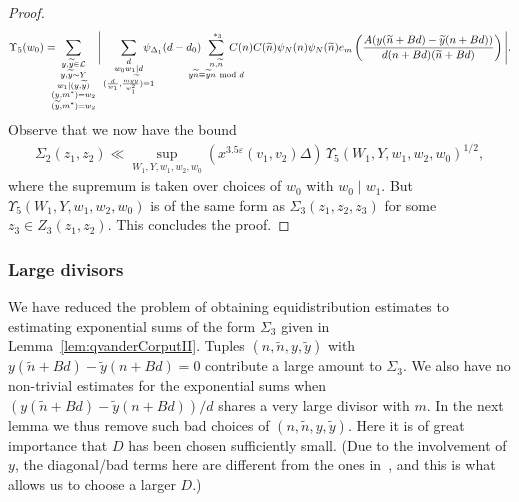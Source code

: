 \documentclass{amsart}
\numberwithin{equation}{section}
\begin{document}
\begin{proof}
\begin{align*}
\Upsilon_5(w_0)=\!\!\!\!\sum_{\substack{y, \widetilde{y} \in \mathcal{L} \\ y, \widetilde{y} \sim Y \\ w_1 \mid (y, \widetilde{y}) \\ (y,m^*)=w_2 \\ (\widetilde{y},m^*)=w_2}}\Bigg|\sum_{\substack{d \\ w_0w_1 \mid d  \\  (\frac{d}{w_1}, \frac{my\widetilde{y}}{w_1^2})=1}} \!\!\!\!\!\!\!\psi_{\Delta_1}(d-d_0) \!\!\!\!\!\!\!\!\sum_{\substack{n, \widetilde{n} \\ y\widetilde{n} \equiv 
\widetilde{y}n  \mbox{ \scriptsize mod } d }}^{\,\,*_3} \!\!\!\!\!\!\!\!\! C(n)  C(\widetilde{n})\psi_N(n)\psi_N(\widetilde{n}) e_{m}\left(\dfrac{A (y(\widetilde{n}+B d)-  \widetilde{y}(n+B d))}{d(n+B d)(\widetilde{n}+B d)}\right)\Bigg|.
\end{align*}
Observe that we now have the bound \begin{align*}
\Sigma_2(z_1,z_2) \ll \sup_{W_1,Y,w_1,w_2,w_0} (x^{3.5\varepsilon}(v_1,v_2) \Delta) \, \Upsilon_5(W_1,Y,w_1,w_2,w_0)^{1/2},
\end{align*}
where the supremum is taken over choices of $w_0$ with $w_0 \mid w_1$. But $\Upsilon_5(W_1,Y,w_1,w_2,w_0)$ is of the same form as $\Sigma_3(z_1,z_2,z_3)$ for some  $z_3 \in Z_3(z_1,z_2)$. This concludes the proof.
\end{proof}
 
 
 

  \subsubsection{Large divisors}
 
We have reduced the problem of obtaining equidistribution estimates to estimating exponential sums of the form $\Sigma_3$ given in Lemma~\ref{lem:qvanderCorputII}. Tuples $(n,\widetilde{n}, y, \widetilde{y})$ with $y(\widetilde{n}+B d)-  \widetilde{y}(n+B d)=0$ contribute a large amount to $\Sigma_3$. We also have no non-trivial estimates for the exponential sums when $(y(\widetilde{n}+B d)-  \widetilde{y}(n+B d))/d$ shares a very large divisor with $m$. In the next lemma we thus remove such bad choices of $(n,\widetilde{n}, y, \widetilde{y})$. Here it is of great importance that $D$ has been chosen sufficiently small. (Due to the involvement of $y$, the diagonal/bad terms here are different from the ones in~\cite{Polymath:2014:EDZ}, and this is what allows us to choose a larger $D$.) 
\end{document}
